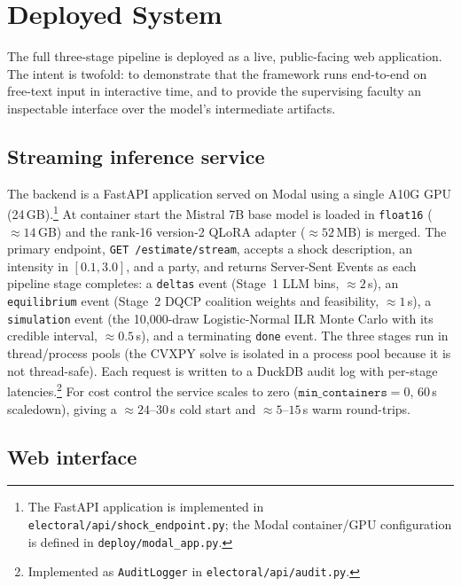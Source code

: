 \documentclass[12pt, letterpaper]{article}
\theoremstyle{definition}
\begin{document}
\section{Deployed System}
\label{sec:system}

The full three-stage pipeline is deployed as a live, public-facing web application.
The intent is twofold: to demonstrate that the framework runs end-to-end on
free-text input in interactive time, and to provide the supervising faculty an
inspectable interface over the model's intermediate artifacts.

\subsection{Streaming inference service}

The backend is a FastAPI application served on Modal using a single A10G GPU
(24\,GB).\footnote{The FastAPI application is implemented in
\texttt{electoral/api/shock\_endpoint.py}; the Modal container/GPU configuration
is defined in \texttt{deploy/modal\_app.py}.}
At container start the Mistral 7B base model is loaded in \texttt{float16} ($\approx
14$\,GB) and the rank-16 version-2 QLoRA adapter ($\approx 52$\,MB) is merged. The
primary endpoint, \texttt{GET /estimate/stream}, accepts a shock description, an
intensity in $[0.1, 3.0]$, and a party, and returns Server-Sent Events as each pipeline
stage completes: a \texttt{deltas} event (Stage~1 LLM bins, $\approx 2$\,s), an
\texttt{equilibrium} event (Stage~2 DQCP coalition weights and feasibility,
$\approx 1$\,s), a \texttt{simulation} event (the 10{,}000-draw Logistic-Normal ILR
Monte Carlo with its credible interval, $\approx 0.5$\,s), and a terminating
\texttt{done} event. The three stages run in thread/process pools (the CVXPY solve is
isolated in a process pool because it is not thread-safe). Each request is written to a
DuckDB audit log with per-stage latencies.\footnote{Implemented as
\texttt{AuditLogger} in \texttt{electoral/api/audit.py}.} For cost control the service
scales to zero
($\texttt{min\_containers} = 0$, $60$\,s scaledown), giving a $\approx 24$--$30$\,s cold
start and $\approx 5$--$15$\,s warm round-trips.

\subsection{Web interface}
\end{document}
